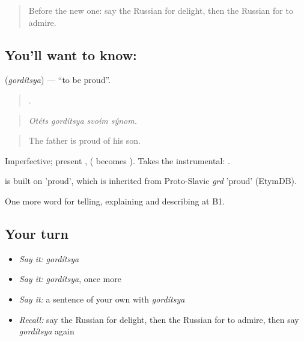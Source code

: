 \label{lesson:RU-C475-gorditsya}



\begin{quote}
Before the new one: say the Russian for delight, then the Russian for to admire.
\end{quote}

\subsection*{You'll want to know: }
\textbf{} (\emph{gordítsya}) — \textquotedblleft{}to be proud\textquotedblright{}.

\begin{quote}
   .
\end{quote}

\begin{quote}
\emph{Otéts gordítsya svoím sýnom.}
\end{quote}

\begin{quote}
The father is proud of his son.
\end{quote}

Imperfective; present ,  ( becomes ). Takes the instrumental: \emph{ }.

\begin{cousinweb}
\emph{} is built on \emph{} 'proud', which is inherited from Proto-Slavic \emph{grd} 'proud' (EtymDB).
\end{cousinweb}

\begin{grammarlens}[title={What you've built}]
One more word for telling, explaining and describing at B1.
\end{grammarlens}

\subsection*{Your turn}
\begin{itemize}
\raggedright
  \item \emph{Say it:} \emph{gordítsya}
  \item \emph{Say it:} \emph{gordítsya}, once more
  \item \emph{Say it:} a sentence of your own with \emph{gordítsya}
  \item \emph{Recall:} say the Russian for delight, then the Russian for to admire, then say \emph{gordítsya} again
\end{itemize}


